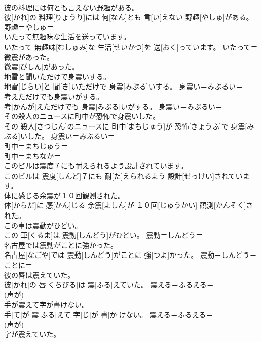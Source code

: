 \documentclass[8pt]{extreport}
\begin{document}
\begin{CJK}{UTF8}{min}
{\\	彼の料理には何とも言えない野趣がある。	
\\	彼[かれ]の 料理[りょうり]には 何[なん]とも 言[い]えない 野趣[やしゅ]がある。	野趣＝やしゅ＝ 
\\	いたって無趣味な生活を送っています。	
\\	いたって 無趣味[むしゅみ]な 生活[せいかつ]を 送[おく]っています。	いたって＝ 
\\	微震があった。	
\\	微震[びしん]があった。	
\\	地雷と聞いただけで身震いする。	
\\	地雷[じらい]と 聞[き]いただけで 身震[みぶる]いする。	身震い＝みぶるい＝ 
\\	考えただけでも身震いがする。	
\\	考[かんが]えただけでも 身震[みぶる]いがする。	身震い＝みぶるい＝ 
\\	その殺人のニュースに町中が恐怖で身震いした。	
\\	その 殺人[さつじん]のニュースに 町中[まちじゅう]が 恐怖[きょうふ]で 身震[みぶる]いした。	身震い＝みぶるい＝ 
\\	町中＝まちじゅう＝ 
\\	町中＝まちなか＝ 
\\	このビルは震度７にも耐えられるよう設計されています。	
\\	このビルは 震度[しんど]７にも 耐[た]えられるよう 設計[せっけい]されています。	
\\	体に感じる余震が１０回観測された。	
\\	体[からだ]に 感[かん]じる 余震[よしん]が １０回[じゅうかい] 観測[かんそく]された。	
\\	この車は震動がひどい。	
\\	この 車[くるま]は 震動[しんどう]がひどい。	震動＝しんどう＝ 
\\	名古屋では震動がことに強かった。	
\\	名古屋[なごや]では 震動[しんどう]がことに 強[つよ]かった。	震動＝しんどう＝ 
\\	ことに＝ 
\\	彼の唇は震えていた。	
\\	彼[かれ]の 唇[くちびる]は 震[ふる]えていた。	震える＝ふるえる＝ 
\\	(声が) 
\\	手が震えて字が書けない。	
\\	手[て]が 震[ふる]えて 字[じ]が 書[か]けない。	震える＝ふるえる＝ 
\\	(声が) 
\\	字が震えていた。	
}
\end{CJK}
\end{document}
